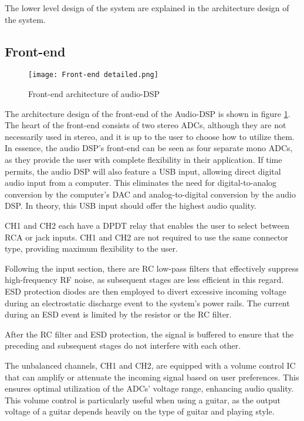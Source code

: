 The lower level design of the system are explained in the architecture design of the system. 

\subsection{Front-end}
\begin{figure}[ht]
    \texttt{[image: Front-end detailed.png]}\\    
    \caption{Front-end architecture of audio-DSP}
    \label{fig:arch-front-end}
\end{figure}

The architecture design of the front-end of the Audio-DSP is shown in figure \ref{fig:arch-front-end}. The heart of the front-end consists of two stereo ADCs, although they are not necessarily used in stereo, and it is up to the user to choose how to utilize them. In essence, the audio DSP's front-end can be seen as four separate mono ADCs, as they provide the user with complete flexibility in their application. If time permits, the audio DSP will also feature a USB input, allowing direct digital audio input from a computer. This eliminates the need for digital-to-analog conversion by the computer's DAC and analog-to-digital conversion by the audio DSP. In theory, this USB input should offer the highest audio quality.

CH1 and CH2 each have a DPDT relay that enables the user to select between RCA or jack inputs. CH1 and CH2 are not required to use the same connector type, providing maximum flexibility to the user.

Following the input section, there are RC low-pass filters that effectively suppress high-frequency RF noise, as subsequent stages are less efficient in this regard. ESD protection diodes are then employed to divert excessive incoming voltage during an electrostatic discharge event to the system's power rails. The current during an ESD event is limited by the resistor or the RC filter.

After the RC filter and ESD protection, the signal is buffered to ensure that the preceding and subsequent stages do not interfere with each other.

The unbalanced channels, CH1 and CH2, are equipped with a volume control IC that can amplify or attenuate the incoming signal based on user preferences. This ensures optimal utilization of the ADCs' voltage range, enhancing audio quality. This volume control is particularly useful when using a guitar, as the output voltage of a guitar depends heavily on the type of guitar and playing style.

